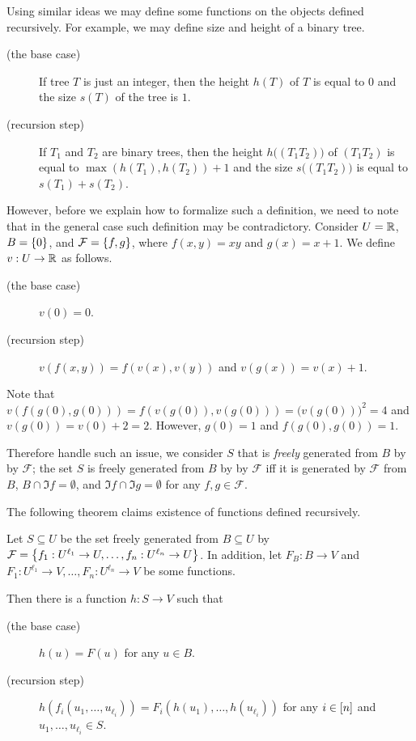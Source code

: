 Using similar ideas we may define some functions on the objects defined
recursively. For example, we may define size and height of a binary tree.
\begin{description}
    \item [(the base case)] If tree $T$ is just an integer, then the height $h(T)$
        of $T$ is equal to $0$ and the size $s(T)$ of the tree is $1$.
    \item[(recursion step)] If $T_1$ and $T_2$ are binary trees, then the height
        $h\big((T_1 T_2)\big)$ of $(T_1 T_2)$ is equal to $\max(h(T_1), h(T_2)) + 1$
        and the size $s\big((T_1 T_2)\big)$ is equal to $s(T_1) + s(T_2)$.
\end{description}

However, before we explain how to formalize such a definition, we need to note
that in the general case such definition may be contradictory. Consider
$U = \mathbb{R}$, $B = \set{0}$, and $\mathcal{F} = \set{f, g}$, where $f(x, y) = xy$
and $g(x) = x + 1$. We define $v : U \to \mathbb{R}$ as follows.
\begin{description}
    \item [(the base case)] $v(0) = 0$.
    \item[(recursion step)] $v(f(x, y)) = f(v(x), v(y))$ and $v(g(x)) = v(x) + 1$.
\end{description}
Note that $v(f(g(0), g(0))) = f(v(g(0)), v(g(0))) = \big(v(g(0))\big)^2 = 4$
and $v(g(0)) = v(0) + 2 = 2$.
However, $g(0) = 1$ and $f(g(0), g(0)) = 1$.

Therefore handle such an issue, we consider $S$ that is \emph{freely} generated
from $B$ by by $\mathcal{F}$; the set $S$ is freely generated
from $B$ by by $\mathcal{F}$ iff it is generated by $\mathcal{F}$ from $B$,
$B \cap \Im f = \emptyset$, and $\Im f \cap \Im g = \emptyset$ for any
$f, g \in \mathcal{F}$.

The following theorem claims existence of functions defined recursively.
\begin{theorem}
\label{theorem:recursion-principle}
    Let $S \subseteq U$ be the set freely generated from $B \subseteq U$ by
    $\mathcal{F} = \set{f_1 : U^{\ell_1} \to U, \dots, f_n : U^{\ell_n} \to U}$.
    In addition, let $F_B : B \to V$ and
    $F_1 : U^{\ell_1} \to V, \dots, F_n : U^{\ell_n} \to V$ be some functions.

    Then there is a function $h : S \to V$ such that
    \begin{description}
        \item [(the base case)] $h(u) = F(u)$ for any $u \in B$.
        \item[(recursion step)] $h(f_i(u_1, \dots, u_{\ell_i})) =
            F_i(h(u_1), \dots, h(u_{\ell_i}))$ for any $i \in [{n}]$ and
            $u_1, \dots, u_{\ell_i} \in S$.
    \end{description}
\end{theorem}

